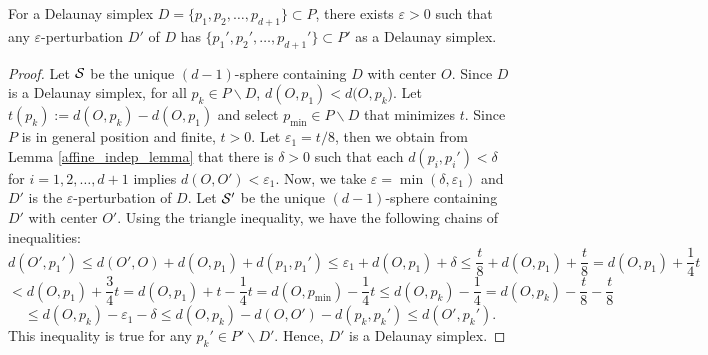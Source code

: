 \documentclass[letterpaper,titlepage]{article}
\begin{document}
\begin{lem}\label{stay-delaunay}
        For a Delaunay simplex $D= \{p_1,p_2,\dots,p_{d+1}\} \subset P$, there exists $\varepsilon>0$ such that any $\varepsilon$-perturbation $D'$ of $D$ has $\{p_1',p_2',\dots,p_{d+1}'\} \subset P'$ as a Delaunay simplex.
    \end{lem}
    \begin{proof}
        Let $\mathcal{S}$ be the unique $(d-1)$-sphere containing $D$ with center $O$. Since $D$ is a Delaunay simplex, for all $p_k \in P\backslash D$, $d(O,p_1) < d(O,p_k$). Let $t(p_k):=d(O,p_k)-d(O,p_1)$ and select $p_{\min} \in P\backslash{D}$ that minimizes $t$. Since $P$ is in general position and finite, $t>0$. Let $\varepsilon_1 = t/8$, then we obtain from Lemma \ref{affine_indep_lemma} that there is $\delta>0$ such that each $d(p_i,p_i')<\delta$ for $i=1,2,\dots,d+1$ implies $d(O,O')<\varepsilon_1$. Now, we take $\varepsilon = \min(\delta, \varepsilon_1)$ and $D'$ is the $\varepsilon$-perturbation of $D$. Let $\mathcal{S}'$ be the unique $(d-1)$-sphere containing $D'$ with center $O'$. Using the triangle inequality, we have the following chains of inequalities:
        $$d(O',p_1') \leq d(O',O)+d(O,p_1)+d(p_1,p_1') \leq \varepsilon_1 + d(O,p_1)+\delta \leq \frac{t}{8}+d(O,p_1)+\frac{t}{8}=d(O,p_1)+\frac{1}{4}t$$
        $$< d(O,p_1)+\frac{3}{4}t = d(O,p_1)+t-\frac{1}{4}t = d(O,p_{\min})-\frac{1}{4}t \leq d(O,p_k)-\frac{1}{4}=d(O,p_{k})-\frac{t}{8}-\frac{t}{8}$$
        $$\leq d(O,p_{k})-\varepsilon_1-\delta \leq d(O,p_{k})-d(O,O')-d(p_{k},p_{k}') \leq d(O',p_{k}').$$
        This inequality is true for any $p_k' \in P'\backslash D'$. Hence, $D'$ is a Delaunay simplex.
    \end{proof}
\end{document}
